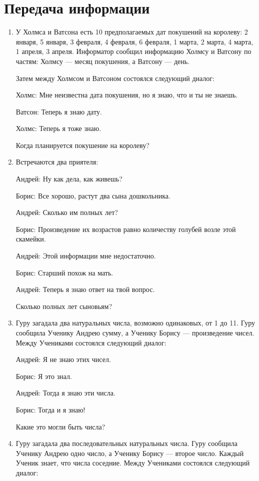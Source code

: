 \documentclass[12pt]{article}
\theoremstyle{definition}
\begin{document}
\setcounter{section}{3}
\section{Передача информации}

\begin{enumerate}
\item У Холмса и Ватсона есть 10 предполагаемых дат покушений на королеву: 2 января, 5 января, 
3 февраля, 4 февраля, 6 февраля, 1 марта, 2 марта, 4 марта, 1 апреля, 3 апреля.
Информатор сообщил информацию Холмсу и Ватсону по частям: Холмсу — месяц покушения, а Ватсону — день.

Затем между Холмсом и Ватсоном состоялся следующий диалог:

Холмс: Мне неизвестна дата покушения, но я знаю, что и ты не знаешь.

Ватсон: Теперь я знаю дату.

Холмс: Теперь я тоже знаю.

Когда планируется покушение на королеву?


\item Встречаются два приятеля:

Андрей: Ну как дела, как живешь?

Борис: Все хорошо, растут два сына дошкольника.

Андрей: Сколько им полных лет?

Борис: Произведение их возрастов равно количеству голубей возле этой скамейки.

Андрей: Этой информации мне недостаточно.

Борис: Старший похож на мать.

Андрей: Теперь я знаю ответ на твой вопрос. 

Сколько полных лет сыновьям?


\item Гуру загадала два натуральных числа, возможно одинаковых, от 1 до 11. 
Гуру сообщила Ученику Андрею сумму, а Ученику Борису — произведение чисел. 
Между Учениками состоялся следующий диалог:

Андрей: Я не знаю этих чисел.

Борис: Я это знал.

Андрей: Тогда я знаю эти числа.

Борис: Тогда и я знаю! 

Какие это могли быть числа?


\item Гуру загадала два последовательных натуральных числа. 
Гуру сообщила Ученику Андрею одно число, а Ученику Борису — второе число. 
Каждый Ученик знает, что числа соседние. Между Учениками состоялся следующий диалог:


\end{enumerate}
\end{document}
